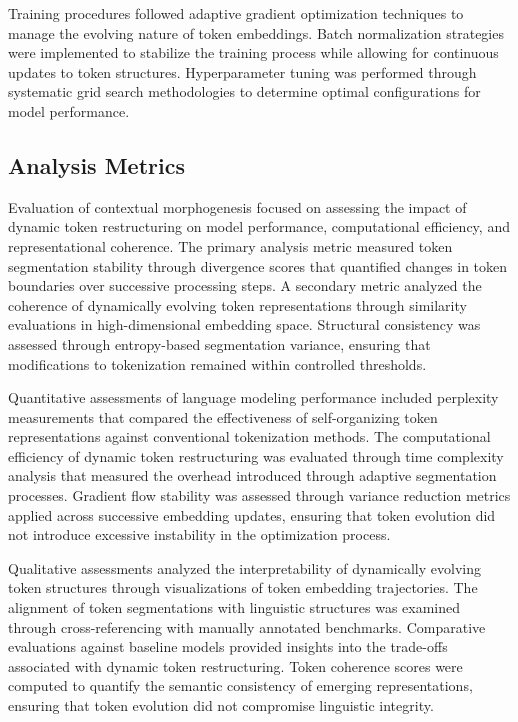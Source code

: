 \documentclass{article}
\begin{document}
Training procedures followed adaptive gradient optimization techniques to manage the evolving nature of token embeddings. Batch normalization strategies were implemented to stabilize the training process while allowing for continuous updates to token structures. Hyperparameter tuning was performed through systematic grid search methodologies to determine optimal configurations for model performance. 

\subsection{Analysis Metrics}

Evaluation of contextual morphogenesis focused on assessing the impact of dynamic token restructuring on model performance, computational efficiency, and representational coherence. The primary analysis metric measured token segmentation stability through divergence scores that quantified changes in token boundaries over successive processing steps. A secondary metric analyzed the coherence of dynamically evolving token representations through similarity evaluations in high-dimensional embedding space. Structural consistency was assessed through entropy-based segmentation variance, ensuring that modifications to tokenization remained within controlled thresholds.

Quantitative assessments of language modeling performance included perplexity measurements that compared the effectiveness of self-organizing token representations against conventional tokenization methods. The computational efficiency of dynamic token restructuring was evaluated through time complexity analysis that measured the overhead introduced through adaptive segmentation processes. Gradient flow stability was assessed through variance reduction metrics applied across successive embedding updates, ensuring that token evolution did not introduce excessive instability in the optimization process.

Qualitative assessments analyzed the interpretability of dynamically evolving token structures through visualizations of token embedding trajectories. The alignment of token segmentations with linguistic structures was examined through cross-referencing with manually annotated benchmarks. Comparative evaluations against baseline models provided insights into the trade-offs associated with dynamic token restructuring. Token coherence scores were computed to quantify the semantic consistency of emerging representations, ensuring that token evolution did not compromise linguistic integrity.
\end{document}
